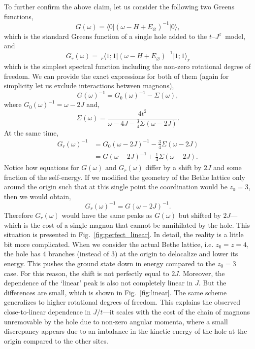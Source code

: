 \documentclass[10pt, a4paper, onecolumn]{article}
\newcommand{\ket}[1]{\vert #1 \rangle}
\newcommand{\bra}[1]{\langle #1 \vert}
\begin{document}
To further confirm the above claim, let us consider the following two Greens functions,
\begin{equation}
	G(\omega) = \bra{0}(\omega - H + E_{\varnothing})^{-1}\ket{0},
\end{equation}
which is the standard Greens function of a single hole added to the $t$--$J^z$~model, and
\begin{equation}
	G_r(\omega) =~_r\bra{1;1}(\omega - H + E_{\varnothing})^{-1}\ket{1;1}_r
\end{equation}
which is the simplest spectral function including the non-zero rotational degree of freedom. We can provide the exact expressions for both of them (again for simplicity let us exclude interactions between magnons),
\begin{equation}
	G(\omega)^{-1} = G_0(\omega)^{-1} - \Sigma(\omega),
\end{equation}
where $G_0(\omega)^{-1} = \omega - 2J$ and,
\begin{equation}
	\Sigma(\omega) = \frac{4t^2}{\omega - 4J - \frac{3}{4}\Sigma(\omega - 2J)}.
\end{equation}
At the same time,
\begin{equation}
\begin{aligned}
	G_r(\omega)^{-1} 
	&= G_0(\omega - 2J)^{-1} - \frac{3}{4}\Sigma(\omega - 2J) \\
	&= G(\omega - 2J)^{-1} + \frac{1}{4}\Sigma(\omega - 2J).
\end{aligned}
\end{equation}
Notice how equations for $G(\omega)$ and $G_r(\omega)$ differ by a shift by $2J$ and some fraction of the self-energy. If we modified the geometry of the Bethe lattice only around the origin such that at this single point the coordination would be $z_0 = 3$, then we would obtain,
\begin{equation}
	G_r(\omega)^{-1} = G(\omega - 2J)^{-1}.	
\end{equation}
Therefore $G_r(\omega)$ would have the same peaks as $G(\omega)$ but shifted by $2J$---which is the cost of a single magnon that cannot be annihilated by the hole. This situation is presented in Fig.~\ref{fig:perfect_linear}. In detail, the reality is a little bit more complicated. When we consider the actual Bethe lattice, i.e. $z_0 = z = 4$, the hole has 4 branches (instead of 3) at the origin to delocalize and lower its energy. This pushes the ground state down in energy compared to the $z_0=3$ case. For this reason, the shift is not perfectly equal to $2J$. Moreover, the dependence of the `linear' peak is also not completely linear in $J$. But the differences are small, which is shown in Fig.~\ref{fig:linear}. The same scheme generalizes to higher rotational degrees of freedom. This explains the observed close-to-linear dependence in $J/t$---it scales with the cost of the chain of magnons unremovable by the hole due to non-zero angular momenta, where a small discrepancy appears due to an imbalance in the kinetic energy of the hole at the origin compared to the other sites.
\end{document}
